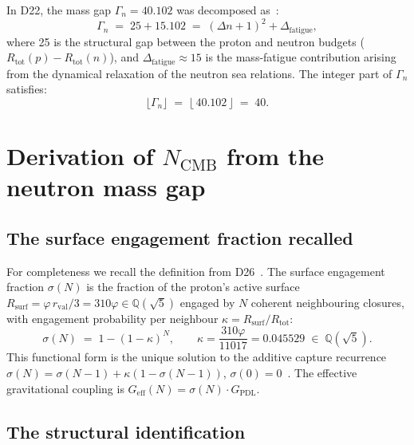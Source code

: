 \documentclass[11pt,a4paper]{article}
\theoremstyle{definition}
\newcommand{\Rsurf}{R_{\mathrm{surf}}}
\newcommand{\Rtot}{R_{\mathrm{tot}}}
\newcommand{\rval}{r_{\mathrm{val}}}
\newcommand{\vp}{\varphi}
\newcommand{\Geff}{G_{\mathrm{eff}}}
\newcommand{\GPDL}{G_{\mathrm{PDL}}}
\newcommand{\kap}{\kappa}
\newcommand{\sig}{\sigma}
\begin{document}
In D22, the mass gap $\Gamma_n = 40.102$ was decomposed as~\cite{Nuclear_Stability_PDL_2026}:
\begin{equation}
\label{eq:gap_decomp}
\Gamma_n \;=\; 25 + 15.102 \;=\; (\Delta n + 1)^2 + \Delta_{\mathrm{fatigue}},
\end{equation}
where 25 is the structural gap between the proton and neutron budgets ($\Rtot(p) - \Rtot(n)$), and $\Delta_{\mathrm{fatigue}} \approx 15$ is the mass-fatigue contribution arising from the dynamical relaxation of the neutron sea relations. The integer part of $\Gamma_n$ satisfies:
\begin{equation}
\label{eq:gap_integer}
\lfloor \Gamma_n \rfloor \;=\; \lfloor\, 40.102\,\rfloor \;=\; 40.
\end{equation}

\section{Derivation of \texorpdfstring{$N_{\mathrm{CMB}}$}{N\_CMB} from the neutron mass gap}
\label{sec:N_CMB}

\subsection{The surface engagement fraction recalled}
\label{subsec:sigma_recalled}

For completeness we recall the definition from D26~\cite{Hubble_Resolution_PDL_2026}. The surface engagement fraction $\sig(N)$ is the fraction of the proton's active surface $\Rsurf = \vp\,\rval/3 = 310\vp \in \mathbb{Q}(\sqrt{5})$ engaged by $N$ coherent neighbouring closures, with engagement probability per neighbour $\kap = \Rsurf/\Rtot$:
\begin{equation}
\label{eq:sigma}
\sig(N) \;=\; 1 - (1-\kap)^N, \qquad \kap = \frac{310\vp}{11017} = 0.045529 \;\in\; \mathbb{Q}(\sqrt{5}).
\end{equation}
This functional form is the unique solution to the additive capture recurrence $\sig(N) = \sig(N-1) + \kap(1-\sig(N-1))$, $\sig(0)=0$~\cite{Hubble_Resolution_PDL_2026}. The effective gravitational coupling is $\Geff(N) = \sig(N)\cdot\GPDL$.

\subsection{The structural identification}
\label{subsec:identification}
\end{document}
